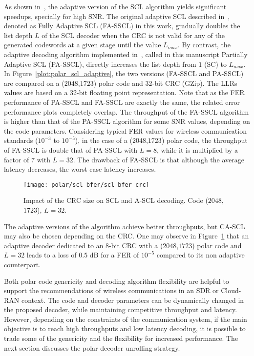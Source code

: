 As shown in~\cite{Sarkis2016}, the adaptive version of the SCL algorithm yields
significant speedups, specially for high SNR. The original adaptive SCL
described in~\cite{Li2012}, denoted as Fully Adaptive SCL (FA-SSCL) in this
work, gradually doubles the list depth $L$ of the SCL decoder when the CRC is
not valid for any of the generated codewords at a given stage until the value
$L_{max}$. By contrast, the adaptive decoding algorithm implemented
in~\cite{Sarkis2016}, called in this manuscript Partially Adaptive SCL
(PA-SSCL), directly increases the list depth from $1$ (SC) to $L_{max}$. In
Figure~\ref{plot:polar_scl_adaptive}, the two versions (FA-SSCL and PA-SSCL) are
compared on a ($2048$,$1723$) polar code and 32-bit CRC (GZip). The LLRs values
are based on a 32-bit floating point representation. Note that as the FER
performance of PA-SSCL and FA-SSCL are exactly the same, the related error
performance plots completely overlap. The throughput of the FA-SSCL algorithm is
higher than that of the PA-SSCL algorithm for some SNR values, depending on the
code parameters. Considering typical FER values for wireless communication
standards ($10^{-3}$ to $10^{-5}$), in the case of a ($2048$,$1723$) polar code,
the throughput of FA-SSCL is double that of PA-SSCL with $L = 8$, while it is
multiplied by a factor of $7$ with $L=32$. The drawback of FA-SSCL is that
although the average latency decreases, the worst case latency increases.

\begin{figure}[htp]
  \centering
  \texttt{[image: polar/scl\_bfer/scl\_bfer\_crc]}
  \caption{Impact of the CRC size on SCL and A-SCL decoding. Code ($2048$,
    $1723$), $L=32$.}
  \label{plot:polar_scl_bfer_crc}
\end{figure}

The adaptive versions of the algorithm achieve better throughputs, but CA-SCL
may also be chosen depending on the CRC. One may observe in
Figure~\ref{plot:polar_scl_bfer_crc} that an adaptive decoder dedicated to an
8-bit CRC with a ($2048$,$1723$) polar code and $L=32$ leads to a loss of $0.5$
dB for a FER of $10^{-5}$ compared to its non adaptive counterpart.

Both polar code genericity and decoding algorithm flexibility are helpful to
support the recommendations of wireless communications in an SDR or Cloud-RAN
context. The code and decoder parameters can be dynamically changed in the
proposed decoder, while maintaining competitive throughput and latency.
However, depending on the constraints of the communication system, if the main
objective is to reach high throughputs and low latency decoding, it is possible
to trade some of the genericity and the flexibility for increased performance.
The next section discusses the polar decoder unrolling strategy.


